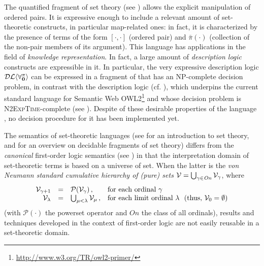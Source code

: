\documentclass[manyauthors]{fundam}
\newcommand{\nonpairssym}{\bar{\pi}}
\newcommand{\nonpairs}[1]{\nonpairssym(#1)}
\begin{document}
The quantified fragment of set theory \Forallpizero (see
\cite{CanLonNic2011}) allows the explicit manipulation of ordered
pairs.  It is expressive enough to include a relevant amount of
set-theoretic constructs, in particular map-related ones: in fact, it
is characterized by the presence of terms of the form $[\cdot,\cdot]$
(ordered pair) and $\nonpairs{\cdot}$ (collection of the non-pair
members of its argument).
%
This language has applications in the field of \emph{knowledge representation}.
In fact, a large amount of \emph{description logic} constructs
are expressible in it. In particular, the very expressive
description logic $\mathcal{DL\langle}\mathbf{\forall_{0}^{\pi}}\mathcal{\rangle}$ can be expressed
in a fragment of \Forallpizero that has an \textsc{NP}-complete
decision problem, in contrast with the description logic
\sroiq (cf. \cite{HorKutSat2006}),  which underpins the current 
standard  language for
Semantic Web OWL2\footnote{\url{http://www.w3.org/TR/owl2-primer/}} 
and whose decision problem is
\textsc{N2ExpTime}-complete (see \cite{Kaz2008}).
%
Despite of these desirable properties of the language \Forallpizero,
no decision procedure for it has been implemented yet.

The semantics of set-theoretic languages (see
\cite{Mos2005} for an introduction to set theory, and
\cite{CanFerOmo89a,CanOmoPol01,SchCanOmo11} for an overview on 
decidable fragments of set theory) differs from the \emph{canonical} 
first-order logic semantics (see \cite{Fitting96}) in that
the interpretation domain of set-theoretic terms is based on a universe of set. When the latter is 
the \emph{von Neumann standard
cumulative hierarchy of (pure) sets} $\mathcal{V} = \bigcup_{\gamma \in 
\mathit{On}} \mathcal{V}_{\gamma}$, where
\[
\begin{array}{rcll}
   \mathcal{V}_{\gamma+1} & = & \mathcal{P}(\mathcal{V}_\gamma) \,,
   & \textrm{for each ordinal $\gamma$}
\\
   \mathcal{V}_\lambda    & = & \bigcup_{\mu < \lambda} \mathcal{V}_\mu
   \,,& \textrm{for each limit ordinal $\lambda$~~(thus, $\mathcal{V}_0 = \emptyset$)}
\end{array}
\]
(with $\mathcal{P}(\cdot)$ the powerset operator and $\mathit{On}$
the class of all ordinals),
results
and techniques developed in the context of first-order logic are not 
easily reusable in a set-theoretic domain.
\end{document}
